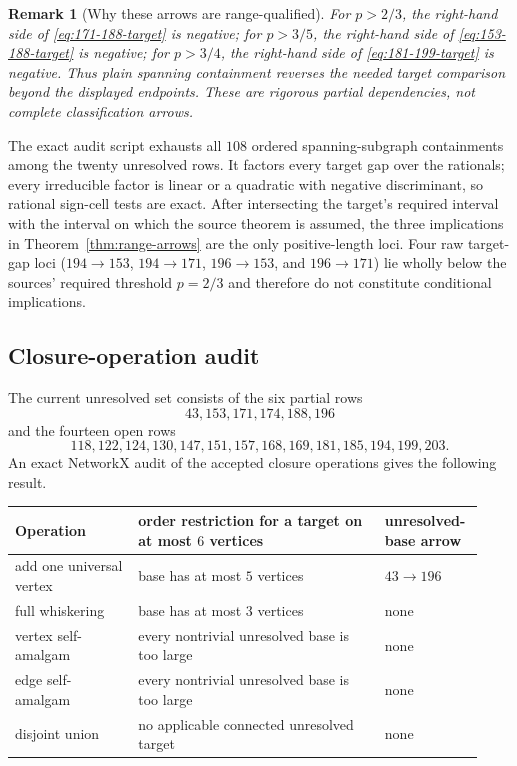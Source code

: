 \documentclass[11pt]{article}
\newtheorem{remark}[theorem]{Remark}
\begin{document}
\begin{remark}[Why these arrows are range-qualified]
For $p>2/3$, the right-hand side of \eqref{eq:171-188-target} is negative;
for $p>3/5$, the right-hand side of \eqref{eq:153-188-target} is negative;
for $p>3/4$, the right-hand side of \eqref{eq:181-199-target} is negative.
Thus plain spanning containment reverses the needed target comparison beyond
the displayed endpoints.  These are rigorous partial dependencies, not
complete classification arrows.
\end{remark}

The exact audit script exhausts all $108$ ordered spanning-subgraph
containments among the twenty unresolved rows.  It factors every target gap
over the rationals; every irreducible factor is linear or a quadratic with
negative discriminant, so rational sign-cell tests are exact.  After
intersecting the target's required interval with the interval on which the
source theorem is assumed, the three implications in
Theorem~\ref{thm:range-arrows} are the only positive-length loci.  Four raw
target-gap loci ($194\to153$, $194\to171$, $196\to153$, and $196\to171$)
lie wholly below the sources' required threshold $p=2/3$ and therefore do
not constitute conditional implications.

\subsection{Closure-operation audit}

The current unresolved set consists of the six partial rows
\[
 43,153,171,174,188,196
\]
and the fourteen open rows
\[
 118,122,124,130,147,151,157,168,169,181,185,194,199,203.
\]
An exact NetworkX audit of the accepted closure operations gives the
following result.

\begin{center}
\begin{tabular}{@{}p{0.25\linewidth}p{0.50\linewidth}p{0.18\linewidth}@{}}
\toprule
Operation & order restriction for a target on at most $6$ vertices
          & unresolved-base arrow\\
\midrule
add one universal vertex & base has at most $5$ vertices
                         & $43\longrightarrow196$\\
full whiskering & base has at most $3$ vertices & none\\
vertex self-amalgam & every nontrivial unresolved base is too large & none\\
edge self-amalgam & every nontrivial unresolved base is too large & none\\
disjoint union & no applicable connected unresolved target & none\\
\bottomrule
\end{tabular}
\end{center}
\end{document}

